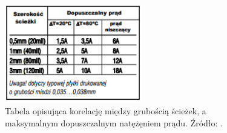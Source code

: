 \begin{figure}[H]
	\centering
	\includegraphics[width=6cm]{img/board_layouts/pcb_wire_thickness.png}
	\caption{Tabela opisująca korelację między grubością ścieżek, a maksymalnym dopuszczalnym natężęniem prądu. Źródło: \cite{pcb_wire_thickness}.}
	\label{fig:image_pcb_wire_thickness}
\end{figure}
 

\begin{figure}[H]
\centering
	\qquad
	

\end{figure}
